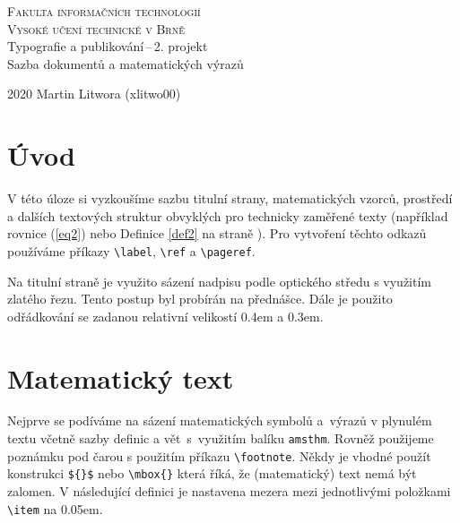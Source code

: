 \documentclass[a4paper,11pt]{article}
\theoremstyle{definition}
\begin{document}
\begin{center}
\Huge
\textsc{Fakulta informačních technologií}\\
\textsc{Vysoké učení technické v Brně}\\
\LARGE
Typografie a publikování\,--\,2. projekt\\
Sazba dokumentů a matematických výrazů\\
\end{center}
{\LARGE 2020 \hfill Martin Litwora (xlitwo00)}
\thispagestyle{empty}
\newpage

\setcounter{page}{1}
\twocolumn
\section*{Úvod}
V této úloze si vyzkoušíme sazbu titulní strany, matematických vzorců, prostředí a dalších textových struktur obvyklých pro technicky zaměřené texty (například rovnice (\ref{eq2}) nebo Definice \ref{def2} na straně \pageref{def1}). Pro vytvoření těchto odkazů používáme příkazy \verb|\label|, \verb|\ref| a \verb|\pageref|.

Na titulní straně je využito sázení nadpisu podle optického středu s využitím zlatého řezu. Tento postup byl probírán na přednášce. Dále je použito odřádkování se zadanou relativní velikostí 0.4em a 0.3em.

\section{Matematický text}
Nejprve se podíváme na sázení matematických symbolů a~výrazů v plynulém textu včetně sazby definic a vět~s~využitím balíku \texttt{amsthm}. Rovněž použijeme poznámku pod čarou s použitím příkazu \verb|\footnote|. Někdy je vhodné použít konstrukci \verb|${}$| nebo \verb|\mbox{}| která říká, že (matematický) text nemá být zalomen. V následující definici je nastavena mezera mezi jednotlivými položkami \verb|\item| na 0.05em.
\end{document}
